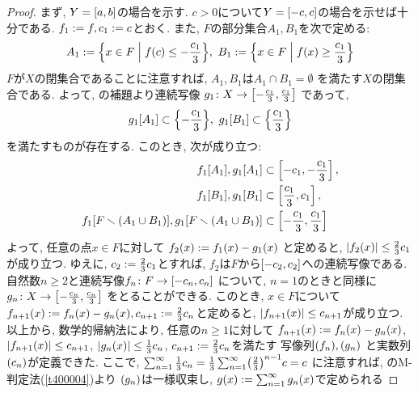 \documentclass[uplatex, dvipdfmx, a4paper, 12pt, class=jsbook, crop=false]{standalone}
\begin{document}
\begin{proof}
	まず, \( Y = \left[ a , b \right] \)の場合を示す.
	\( c > 0 \)について\( Y = \left[ -c , c \right] \)の場合を示せば十分である.
	\( f_1 \mathrel{:=} f, c_1 \mathrel{:=} c \)とおく.
	また, \( F \)の部分集合\( A_1, B_1 \)を次で定める:
	\[ A_1 \defeq \setcomp{x \in F}{\mappt{f}{c}
	\leq -\frac{c_1}{3}}, \
	B_1 \defeq \setcomp{x \in F}{\mappt{f}{x}
	\geq \frac{c_1}{3}} \]
	$ F $が$ X $の閉集合であることに注意すれば,
	\( A_1, B_1 \)は\( A_1 \cap B_1 = \emptyset \)
	を満たす\( X \)の閉集合である.
	よって, \Urysohn の補題より連続写像
	\( g_1\colon X\to\left[ -\frac{c_1}{3} , \frac{c_1}{3} \right] \)
	であって,
	\[ \mapset{g_1}{A_1} \subset \lrbrace{-\frac{c_1}{3}}, \
	\mapset{g_1}{B_1} \subset \lrbrace{\frac{c_1}{3}} \]
	を満たすものが存在する.
	このとき, 次が成り立つ:
	\begin{align*}
	\mapset{f_1}{A_1}, \mapset{g_1}{A_1} & \subset \intcc{-c_1}{-\frac{c_1}{3}}, \\
	\mapset{f_1}{B_1}, \mapset{g_1}{B_1} & \subset \intcc{\frac{c_1}{3}}{c_1}, \\
	\mapset{f_1}{F \setminus \lrparen{A_1 \cup B_1}},
	\mapset{g_1}{F \setminus \lrparen{A_1 \cup B_1}} &
	\subset \intcc{-\frac{c_1}{3}}{\frac{c_1}{3}}
	\end{align*}
	よって, 任意の点\( x \in F \)に対して
	\( \mappt{f_2}{x} \defeq \mappt{f_1}{x} - \mappt{g_1}{x} \)
	と定めると,
	\( \abs{\mappt{f_2}{x}} \leq \frac{2}{3}c_1 \)が成り立つ.
	ゆえに, \( c_2 \mathrel{:=} \frac{2}{3}c_1 \)とすれば,
	\( f_2 \)は\( F \)から\( \left[ -c_2 , c_2 \right] \)への連続写像である.
	自然数\( n \geq 2 \)と連続写像\( f_n\colon F\to\left[ -c_n , c_n \right] \)
	について, \( n = 1 \)のときと同様に
	\( g_n\colon X\to\left[ -\frac{c_n}{3} , \frac{c_n}{3} \right] \)
	をとることができる.
	このとき, \( x \in F \)について
	\( \mappt{f_{n+1}}{x}\defeq \mappt{f_n}{x} - \mappt{g_n}{x},
	c_{n+1} \defeq \frac{2}{3}c_n \)と定めると,
	\( \abs{\mappt{f_{n+1}}{x}} \leq c_{n+1} \)が成り立つ.
	以上から, 数学的帰納法により, 任意の\( n \geq 1 \)に対して
	\( \mappt{f_{n+1}}{x} \defeq \mappt{f_n}{x} - \mappt{g_n}{x} \),
	\( \abs{\mappt{f_{n+1}}{x}} \leq c_{n+1} \),
	\( \abs{\mappt{g_{n}}{x}} \leq \frac{1}{3}c_n \),
	\( c_{n+1} \mathrel{:=} \frac{2}{3}c_n \)を満たす
	写像列\( \lrparen{f_n}, \lrparen{g_n} \)
	と実数列\( \lrparen{c_n} \)が定義できた.
	ここで, \( \sum_{n=1}^{\infty} \frac{1}{3}c_n
	= \frac{1}{3}\sum_{n=1}^{\infty} \lrparen{\frac{2}{3}}^{n-1}c = c \)
	に注意すれば, \Weierstrass のM-判定法(\cref{t400004})より
	\( \lrparen{g_n} \)は一様収束し,
	\( \mappt{g}{x} \defeq \sum_{n=1}^{\infty}\mappt{g_n}{x} \)で定められる

\end{proof}
\end{document}
